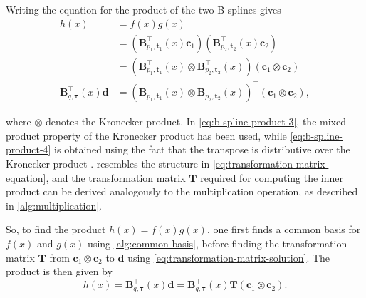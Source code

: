 Writing the equation for the product of the two B-splines gives
\begin{subequations}\label{eq:b-spline-product}
    \begin{align}
        h(x) &= f(x) g(x) \label{eq:b-spline-product-1} \\
        &= \left(\mathbf{B}_{p_1, \mathbf{t}_1}^{\top}(x) \mathbf{c}_1\right) 
        \left(\mathbf{B}_{p_2, \mathbf{t}_2}^{\top}(x) \mathbf{c}_2\right) \label{eq:b-spline-product-2} \\
        &= \left(\mathbf{B}_{p_1, \mathbf{t}_1}^{\top}(x) \otimes \mathbf{B}_{p_2, \mathbf{t}_2}^{\top}(x)\right) 
        \left(\mathbf{c}_1 \otimes \mathbf{c}_2\right) \label{eq:b-spline-product-3} \\
        \mathbf{B}_{q, \boldsymbol{\tau}}^{\top}(x) \mathbf{d} 
        &= \left(\mathbf{B}_{p_1, \mathbf{t}_1}(x) \otimes \mathbf{B}_{p_2, \mathbf{t}_2}(x)\right)^{\top} \left(\mathbf{c}_1 \otimes \mathbf{c}_2\right), \label{eq:b-spline-product-4}
    \end{align}
\end{subequations}

where $\otimes$ denotes the Kronecker product. In \cref{eq:b-spline-product-3}, the mixed product property of the Kronecker product has been used, while \cref{eq:b-spline-product-4} is obtained using the fact that the transpose is distributive over the Kronecker product \citep{LOAN200085}.  resembles the structure in \cref{eq:transformation-matrix-equation}, and the transformation matrix $\mathbf T$ required for computing the inner product can be derived analogously to the multiplication operation, as described in \cref{alg:multiplication}.

So, to find the product $h(x) = f(x) g(x)$, one first finds a common basis for $f(x)$ and $g(x)$ using \cref{alg:common-basis}, before finding the transformation matrix $\mathbf T$ from $\mathbf c_1 \otimes \mathbf c_2$ to $\mathbf d$ using \cref{eq:transformation-matrix-solution}. The product is then given by
\begin{equation}
    h(x) = \mathbf B_{q, \boldsymbol{\tau}}^\top(x) \mathbf d = \mathbf B_{q, \boldsymbol{\tau}}^\top(x) \mathbf T (\mathbf c_1 \otimes \mathbf c_2).
\end{equation}

